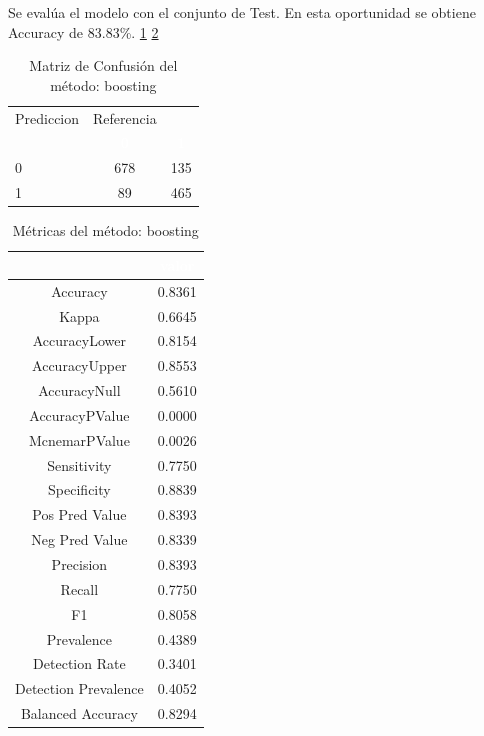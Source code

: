 Se evalúa el modelo con el conjunto de Test. En esta oportunidad se obtiene  Accuracy de 83.83\%. \ref{tab:MatrizConf_boosting} \ref{tab:metricas_boosting}

\begin{table}[!h]
	
	\caption{\label{tab:MatrizConf_boosting}Matriz de Confusión del método: boosting }
	\centering
	\begin{tabular}[t]{lcc}
		\toprule
		\multicolumn{1}{c}{Prediccion} & \multicolumn{1}{c}{Referencia} & \multicolumn{1}{c}{ } \\
		\cmidrule(l{3pt}r{3pt}){1-1} \cmidrule(l{3pt}r{3pt}){2-2}
		\rowcolor{black}  \multicolumn{1}{c}{\textcolor{white}{\textbf{ }}} & \multicolumn{1}{c}{\textcolor{white}{\textbf{0}}} & \multicolumn{1}{c}{\textcolor{white}{\textbf{1}}}\\
		\midrule
		\rowcolor{gray!6}  0 & 678 & 135\\
		1 & 89 & 465\\
		\bottomrule
	\end{tabular}
\end{table}

\begin{table}[!h]
	
	\caption{\label{tab:metricas_boosting}Métricas del método: boosting }
	\centering
	\begin{tabular}[t]{cc}
		\toprule
		\rowcolor{black}  \multicolumn{1}{c}{\textcolor{white}{\textbf{metricas}}} & \multicolumn{1}{c}{\textcolor{white}{\textbf{valor}}}\\
		\midrule
		\rowcolor{gray!6}  Accuracy & 0.8361\\
		Kappa & 0.6645\\
		\rowcolor{gray!6}  AccuracyLower & 0.8154\\
		AccuracyUpper & 0.8553\\
		\rowcolor{gray!6}  AccuracyNull & 0.5610\\
		\addlinespace
		AccuracyPValue & 0.0000\\
		\rowcolor{gray!6}  McnemarPValue & 0.0026\\
		Sensitivity & 0.7750\\
		\rowcolor{gray!6}  Specificity & 0.8839\\
		Pos Pred Value & 0.8393\\
		\addlinespace
		\rowcolor{gray!6}  Neg Pred Value & 0.8339\\
		Precision & 0.8393\\
		\rowcolor{gray!6}  Recall & 0.7750\\
		F1 & 0.8058\\
		\rowcolor{gray!6}  Prevalence & 0.4389\\
		\addlinespace
		Detection Rate & 0.3401\\
		\rowcolor{gray!6}  Detection Prevalence & 0.4052\\
		Balanced Accuracy & 0.8294\\
		\bottomrule
	\end{tabular}
\end{table}



